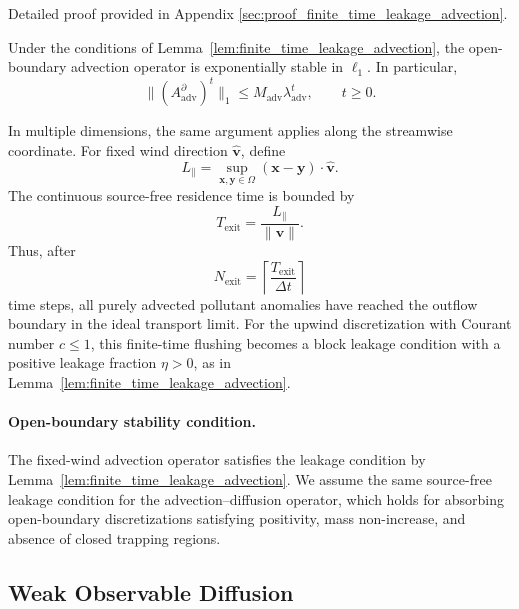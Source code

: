 Detailed proof provided in Appendix \ref{sec:proof_finite_time_leakage_advection}.

\begin{corollary}
\label{cor:adv_exp_stability_derived}
Under the conditions of Lemma~\ref{lem:finite_time_leakage_advection},
the open-boundary advection operator is exponentially stable in
\(\ell_1\). In particular,
\[
\|(A_{\mathrm{adv}}^{\partial})^t\|_1
\le
M_{\mathrm{adv}}\lambda_{\mathrm{adv}}^t,
\qquad t\ge 0.
\]
\end{corollary}

In multiple dimensions, the same argument applies along the streamwise
coordinate. For fixed wind direction \(\widehat{\mathbf v}\), define
\[
L_{\parallel}
=
\sup_{\mathbf x,\mathbf y\in\Omega}
(\mathbf x-\mathbf y)\cdot \widehat{\mathbf v}.
\]
The continuous source-free residence time is bounded by
\[
T_{\mathrm{exit}}
=
\frac{L_{\parallel}}{\|\mathbf v\|}.
\]
Thus, after
\[
N_{\mathrm{exit}}
=
\left\lceil
\frac{T_{\mathrm{exit}}}{\Delta t}
\right\rceil
\]
time steps, all purely advected pollutant anomalies have reached the
outflow boundary in the ideal transport limit. For the upwind
discretization with Courant number \(c\le 1\), this finite-time
flushing becomes a block leakage condition with a positive leakage
fraction \(\eta>0\), as in Lemma~\ref{lem:finite_time_leakage_advection}.

\paragraph{Open-boundary stability condition.}
The fixed-wind advection operator satisfies the leakage condition by
Lemma~\ref{lem:finite_time_leakage_advection}. We assume the same
source-free leakage condition for the advection--diffusion operator,
which holds for absorbing open-boundary discretizations satisfying
positivity, mass non-increase, and absence of closed trapping regions.


\subsection{Weak Observable Diffusion}
